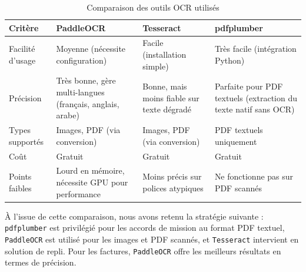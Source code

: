 \documentclass[12pt,a4paper]{report}
\begin{document}
\begin{table}[H]

\centering

\caption{Comparaison des outils OCR utilisés}

\label{tab:ocr_comparison}

\begin{tabular}{|p{2.5cm}|p{3cm}|p{3cm}|p{3cm}|}

\hline

\textbf{Critère} & \textbf{PaddleOCR} & \textbf{Tesseract} & \textbf{pdfplumber} \\

\hline

Facilité d’usage & Moyenne (nécessite configuration) & Facile (installation simple) & Très facile (intégration Python) \\

\hline

Précision & Très bonne, gère multi-langues (français, anglais, arabe) & Bonne, mais moins fiable sur texte dégradé & Parfaite pour PDF textuels (extraction du texte natif sans OCR) \\

\hline

Types supportés & Images, PDF (via conversion) & Images, PDF (via conversion) & PDF textuels uniquement \\

\hline

Coût & Gratuit & Gratuit & Gratuit \\

\hline

Points faibles & Lourd en mémoire, nécessite GPU pour performance & Moins précis sur polices atypiques & Ne fonctionne pas sur PDF scannés \\

\hline

\end{tabular}

\end{table}



À l'issue de cette comparaison, nous avons retenu la stratégie suivante : \texttt{pdfplumber} est privilégié pour les accords de mission au format PDF textuel, \texttt{PaddleOCR} est utilisé pour les images et PDF scannés, et \texttt{Tesseract} intervient en solution de repli. Pour les factures, \texttt{PaddleOCR} offre les meilleurs résultats en termes de précision.
\end{document}

